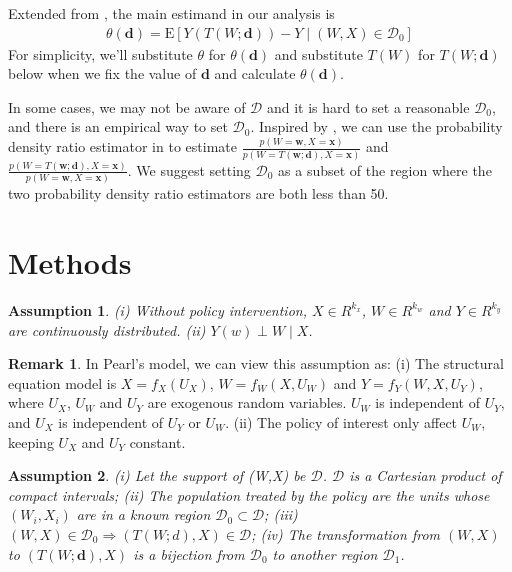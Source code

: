 \documentclass[11pt]{article}
\def\E{{\mathrm E}}
\numberwithin{equation}{section}
\newtheorem{assumption}{Assumption}[section]
\theoremstyle{definition}
\newtheorem{remark}{Remark}[section]
\begin{document}
Extended from \cite{munoz2012population}, the main estimand in our analysis is
\begin{align}
    \theta(\mathbf{d})=\E[Y(T(W;\mathbf{d}))-Y\mid (W,X)\in \mathcal{D}_0] 
\end{align}
For simplicity, we'll substitute $\theta$ for $\theta(\mathbf{d})$ and substitute $T(W)$ for $T(W;\mathbf{d})$ below when we fix the value of $\mathbf{d}$ and calculate $\theta(\mathbf{d})$.

In some cases, we may not be aware of $\mathcal{D}$ and it is hard to set a reasonable $\mathcal{D}_0$, and there is an empirical way to set $\mathcal{D}_0$. Inspired by \cite{mccoy2023semi}, we can use the probability density ratio estimator in \cite{lin2023estimation} to estimate $\frac{p(W=\mathbf{w},X=\mathbf{x})}{p(W=T(\mathbf{w};\mathbf{d}),X=\mathbf{x})}$ and $\frac{p(W=T(\mathbf{w};\mathbf{d}),X=\mathbf{x})}{p(W=\mathbf{w},X=\mathbf{x})}$. We suggest setting $\mathcal{D}_0$ as a subset of the region where the two probability density ratio estimators are both less than 50.

\section{Methods}\label{sec:setup}
\begin{assumption}\label{ass:1}
(i) Without policy intervention, $X \in R^{k_x}$, $W \in R^{k_w}$ and $Y \in R^{k_y}$ are continuously distributed. (ii) $Y(w)\perp W\mid X$.
\end{assumption}
\begin{remark}
In Pearl's model, we can view this assumption as: (i) The structural equation model is $X = f_X(U_X)$, $W = f_W(X, U_W)$ and $Y = f_Y (W, X, U_Y )$, where  $U_{X}$, $U_{W}$ and  $U_{Y}$  are exogenous random variables. $U_{W}$ is independent of $ U_{Y}$, and $U_{X}$ is independent of $ U_{Y}$ or $U_{W}$. (ii) The policy of interest only affect $U_{W}$, keeping $U_{X}$ and $ U_{Y}$ constant.
\end{remark}


\begin{assumption}\label{ass:2}
(i) Let the support of (W,X) be $\mathcal{D}$. $\mathcal{D}$ is a Cartesian product of compact intervals; (ii) The population treated by the policy are the units whose $(W_i,X_i)$ are in a known region $\mathcal{D}_0\subset\mathcal{D}$; (iii) $(W,X) \in \mathcal{D}_0\Rightarrow (T(W;d),X)\in \mathcal{D}$; (iv) The transformation from $(W,X)$ to $(T(W;\mathbf{d}),X)$ is a bijection from $\mathcal{D}_0$ to another region $\mathcal{D}_1$.
\end{assumption}
\end{document}

